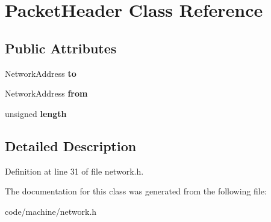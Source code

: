\section{Packet\+Header Class Reference}
\label{class_packet_header}
\subsection*{Public Attributes}
\begin{DoxyCompactItemize}
\item 
Network\+Address {\bfseries to}\label{class_packet_header_a928d5f00dfc8c7ef789b40c7e23482a6}

\item 
Network\+Address {\bfseries from}\label{class_packet_header_ae385e650d708b1682c5705ce20dbb6c1}

\item 
unsigned {\bfseries length}\label{class_packet_header_aae6f56002b452b6dc43828fbf1a37699}

\end{DoxyCompactItemize}


\subsection{Detailed Description}


Definition at line 31 of file network.\+h.



The documentation for this class was generated from the following file\+:\begin{DoxyCompactItemize}
\item 
code/machine/network.\+h\end{DoxyCompactItemize}
